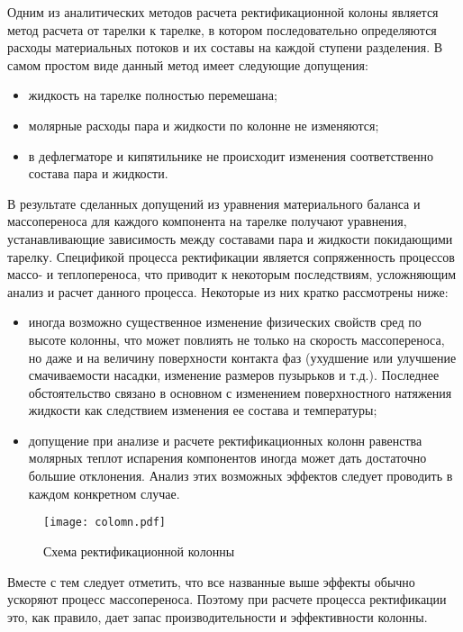 Одним из аналитических методов расчета ректификационной колоны является метод расчета от тарелки к тарелке, в котором последовательно определяются расходы материальных потоков и их составы на каждой ступени разделения. В самом простом виде данный метод имеет следующие допущения:
\begin{itemize}
	\item жидкость на тарелке полностью перемешана;
	\item молярные расходы пара и жидкости по колонне не изменяются;
	\item в дефлегматоре и кипятильнике не происходит изменения соответственно состава пара и жидкости.
\end{itemize}

В результате сделанных допущений из уравнения материального баланса и массопереноса для каждого компонента на тарелке получают уравнения, устанавливающие зависимость между составами пара и жидкости покидающими тарелку. 
Спецификой процесса ректификации является сопряженность процессов массо- и теплопереноса, что приводит к некоторым последствиям, усложняющим анализ и расчет данного процесса. Некоторые из них кратко рассмотрены ниже:
\begin{itemize}
	\item иногда возможно существенное изменение физических свойств сред по высоте колонны, что может повлиять не только на скорость массопереноса, но даже и на величину поверхности контакта фаз (ухудшение или улучшение смачиваемости насадки, изменение размеров пузырьков и т.д.). Последнее обстоятельство связано в основном с изменением поверхностного натяжения жидкости как следствием изменения ее состава и температуры;
	\item допущение при анализе и расчете ректификационных колонн равенства молярных теплот испарения компонентов иногда может дать достаточно большие отклонения. Анализ этих возможных эффектов следует проводить в каждом конкретном случае.
\end{itemize}

\begin{wrapfigure}{R}{0.5\textwidth}
	\begin{center}
 		\texttt{[image: colomn.pdf]}
	\end{center}
	\caption{Схема ректификационной колонны} \label{fig:rect.col}
\end{wrapfigure}
 
Вместе с тем следует отметить, что все названные выше эффекты обычно ускоряют процесс массопереноса. Поэтому при расчете процесса ректификации это, как правило, дает запас производительности и эффективности колонны.

